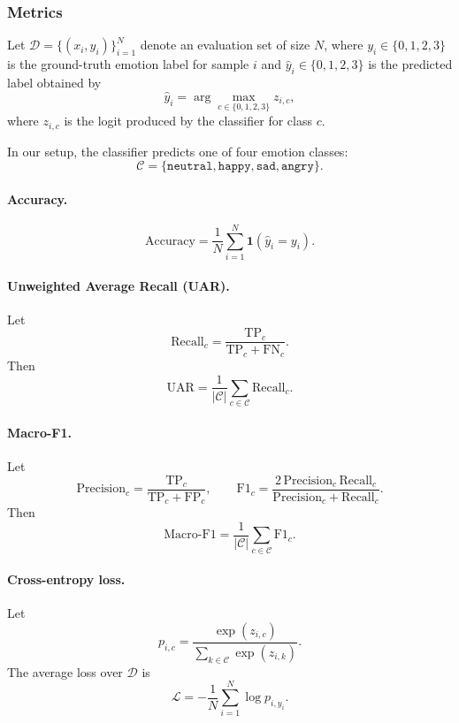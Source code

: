 \documentclass[11pt]{article}
\begin{document}
\subsubsection{Metrics}
\label{app:metrics}

Let $\mathcal{D} = \{(x_i, y_i)\}_{i=1}^{N}$ denote an evaluation set of size $N$, where
$y_i \in \{0,1,2,3\}$ is the ground-truth emotion label for sample $i$ and
$\hat{y}_i \in \{0,1,2,3\}$ is the predicted label obtained by
\[
\hat{y}_i = \arg\max_{c \in \{0,1,2,3\}} z_{i,c},
\]
where $z_{i,c}$ is the logit produced by the classifier for class $c$.

In our setup, the classifier predicts one of four emotion classes:
\[
\mathcal{C} = \{\texttt{neutral}, \texttt{happy}, \texttt{sad}, \texttt{angry}\}.
\]

\paragraph{Accuracy.}
\[
\mathrm{Accuracy}
=
\frac{1}{N}
\sum_{i=1}^{N}
\mathbf{1}(\hat{y}_i = y_i).
\]

\paragraph{Unweighted Average Recall (UAR).}
Let
\[
\mathrm{Recall}_c
=
\frac{\mathrm{TP}_c}{\mathrm{TP}_c + \mathrm{FN}_c}.
\]
Then
\[
\mathrm{UAR}
=
\frac{1}{|\mathcal{C}|}
\sum_{c \in \mathcal{C}} \mathrm{Recall}_c.
\]

\paragraph{Macro-F1.}
Let
\[
\mathrm{Precision}_c
=
\frac{\mathrm{TP}_c}{\mathrm{TP}_c + \mathrm{FP}_c},
\qquad
\mathrm{F1}_c
=
\frac{2\,\mathrm{Precision}_c\,\mathrm{Recall}_c}
{\mathrm{Precision}_c + \mathrm{Recall}_c}.
\]
Then
\[
\mathrm{Macro\text{-}F1}
=
\frac{1}{|\mathcal{C}|}
\sum_{c \in \mathcal{C}} \mathrm{F1}_c.
\]

\paragraph{Cross-entropy loss.}
Let
\[
p_{i,c}
=
\frac{\exp(z_{i,c})}{\sum_{k \in \mathcal{C}} \exp(z_{i,k})}.
\]
The average loss over $\mathcal{D}$ is
\[
\mathcal{L}
=
-\frac{1}{N}
\sum_{i=1}^{N}
\log p_{i,y_i}.
\]
\end{document}
